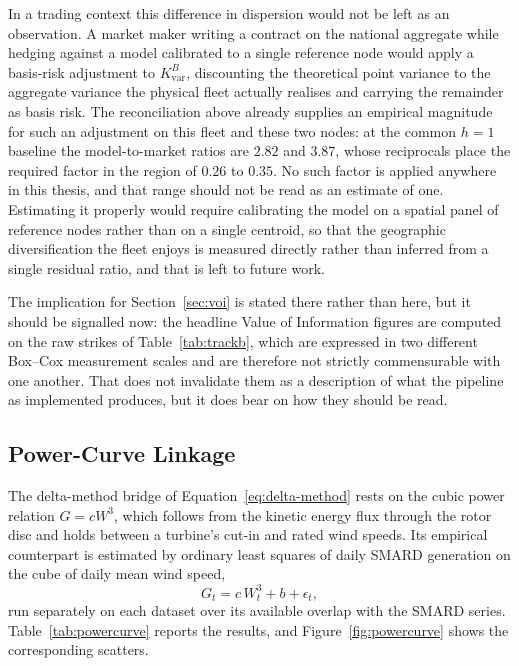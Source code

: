 \documentclass[11pt, a4paper, twoside]{article}
\begin{document}
In a trading context this difference in dispersion would not be left as an observation. A market maker writing a contract on the national aggregate while hedging against a model calibrated to a single reference node would apply a basis-risk adjustment to $K_{\text{var}}^B$, discounting the theoretical point variance to the aggregate variance the physical fleet actually realises and carrying the remainder as basis risk. The reconciliation above already supplies an empirical magnitude for such an adjustment on this fleet and these two nodes: at the common $h = 1$ baseline the model-to-market ratios are $2.82$ and $3.87$, whose reciprocals place the required factor in the region of $0.26$ to $0.35$. No such factor is applied anywhere in this thesis, and that range should not be read as an estimate of one. Estimating it properly would require calibrating the model on a spatial panel of reference nodes rather than on a single centroid, so that the geographic diversification the fleet enjoys is measured directly rather than inferred from a single residual ratio, and that is left to future work.

The implication for Section~\ref{sec:voi} is stated there rather than here, but it should be signalled now: the headline Value of Information figures are computed on the raw strikes of Table~\ref{tab:trackb}, which are expressed in two different Box--Cox measurement scales and are therefore not strictly commensurable with one another. That does not invalidate them as a description of what the pipeline as implemented produces, but it does bear on how they should be read.

\subsection{Power-Curve Linkage}
\label{sec:powercurve}

The delta-method bridge of Equation~\eqref{eq:delta-method} rests on the cubic power relation $G = cW^3$, which follows from the kinetic energy flux through the rotor disc and holds between a turbine's cut-in and rated wind speeds. Its empirical counterpart is estimated by ordinary least squares of daily SMARD generation on the cube of daily mean wind speed,
\begin{equation}
G_t = c\,W_t^3 + b + \epsilon_t,
\end{equation}
run separately on each dataset over its available overlap with the SMARD series. Table~\ref{tab:powercurve} reports the results, and Figure~\ref{fig:powercurve} shows the corresponding scatters.
\end{document}
